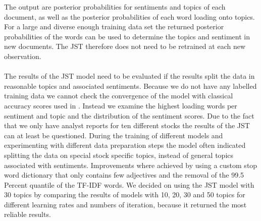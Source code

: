 The output are posterior probabilities for sentiments and topics of each document, as well as the posterior probabilities of each word loading onto topics. For a large and diverse enough training data set the returned posterior probabilities of the words can be used to determine the topics and sentiment in new documents. The JST therefore does not need to be retrained at each new observation. \\ \\
The results of the JST model need to be evaluated if the results split the data in reasonable topics and associated sentiments. Because we do not have any labelled training data we cannot check the convergence of the model with classical accuracy scores used in \citet{lin2009joint}. Instead we examine the highest loading words per sentiment and topic and the distribution of the sentiment scores. Due to the fact that we only have analyst reports for ten different stocks the results of the JST can at least be questioned. During the training of different models and experimenting with different data preparation steps the model often indicated splitting the data on special stock specific topics, instead of general topics associated with sentiments. Improvements where achieved by using a custom stop word dictionary that only contains few adjectives and the removal of the 99.5 Percent quantile of the TF-IDF words. We decided on using the JST model with 30 topics by comparing the results of models with 10, 20, 30 and 50 topics for different learning rates and numbers of iteration, because it returned the most reliable results. \\

